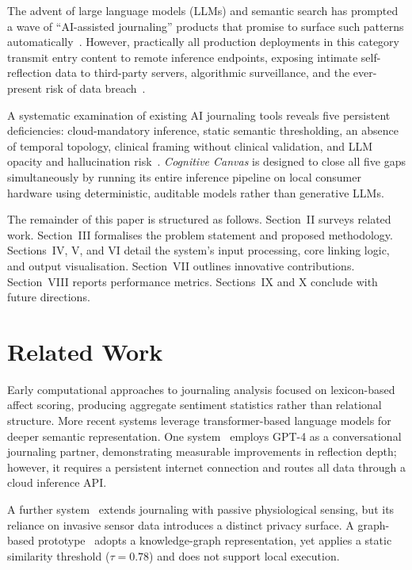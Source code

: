 \documentclass[12pt]{article}
\newcommand{\CC}{\textit{Cognitive Canvas}}
\begin{document}
The advent of large language models (LLMs) and semantic search has prompted a wave of ``AI-assisted journaling'' products that promise to surface such patterns automatically~\cite{xu2023mindfuldiary}. However, practically all production deployments in this category transmit entry content to remote inference endpoints, exposing intimate self-reflection data to third-party servers, algorithmic surveillance, and the ever-present risk of data breach~\cite{feretzakis2024}. 

A systematic examination of existing AI journaling tools reveals five persistent deficiencies: cloud-mandatory inference, static semantic thresholding, an absence of temporal topology, clinical framing without clinical validation, and LLM opacity and hallucination risk~\cite{ji2023hallucination, sage2025, tauscher2023}. \CC{} is designed to close all five gaps simultaneously by running its entire inference pipeline on local consumer hardware using deterministic, auditable models rather than generative LLMs.

The remainder of this paper is structured as follows. Section~II surveys related work. Section~III formalises the problem statement and proposed methodology. Sections~IV, V, and VI detail the system's input processing, core linking logic, and output visualisation. Section~VII outlines innovative contributions. Section~VIII reports performance metrics. Sections~IX and X conclude with future directions.

\section{Related Work}

Early computational approaches to journaling analysis focused on lexicon-based affect scoring, producing aggregate sentiment statistics rather than relational structure. More recent systems leverage transformer-based language models for deeper semantic representation. One system~\cite{xu2023mindfuldiary} employs GPT-4 as a conversational journaling partner, demonstrating measurable improvements in reflection depth; however, it requires a persistent internet connection and routes all data through a cloud inference API. 

A further system~\cite{mindscape} extends journaling with passive physiological sensing, but its reliance on invasive sensor data introduces a distinct privacy surface. A graph-based prototype~\cite{cjournal2024} adopts a knowledge-graph representation, yet applies a static similarity threshold ($\tau = 0.78$) and does not support local execution.
\end{document}
